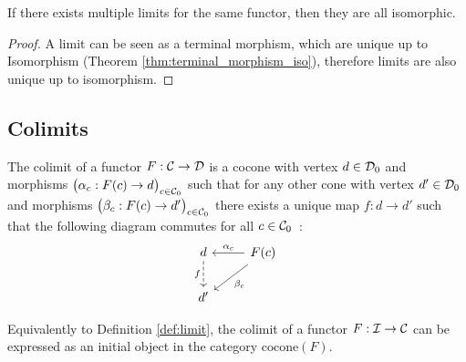 \begin{theorem}
	If there exists multiple limits for the same functor, then they are all
	isomorphic.

	\begin{proof}
		A limit can be seen as a terminal morphism, which are unique up to
		Isomorphism (Theorem \ref{thm:terminal_morphism_iso}), therefore limits are
		also unique up to isomorphism.
	\end{proof}
\end{theorem}

\subsection{Colimits}

\begin{definition}
	The colimit of a functor $F:\mathcal{C}\to \mathcal{D}$ is a cocone with vertex $d\in \mathcal{D}_0$ and
	morphisms $\big(\alpha_c: F(c)\to d\big)_{c\in \mathcal{C}_0}$ such that for any other
	cone with vertex $d'\in \mathcal{D}_0$ and morphisms $\big(\beta_c: F(c)\to
	d'\big)_{c\in \mathcal{C}_0}$ there exists a unique map $f:d\to d'$ such that the
	following diagram commutes for all $c\in
	\mathcal{C}_0$~\parencite[p.~126]{leinster:basic_category_theory}:
	\[\begin{tikzcd}[ampersand replacement=\&]
		d \& {F(c)} \\
		{d'}
		\arrow["{\alpha_c}"', from=1-2, to=1-1]
		\arrow["{\beta_c}", from=1-2, to=2-1]
		\arrow["f"', dashed, from=1-1, to=2-1]
	\end{tikzcd}\]
\end{definition}

\begin{definition}
	Equivalently to Definition \ref{def:limit}, the colimit of a functor $F:\mathcal{I}\to
	\mathcal{C}$ can be expressed as an initial object in the category
	$\mathrm{cocone}(F)$.
\end{definition}

